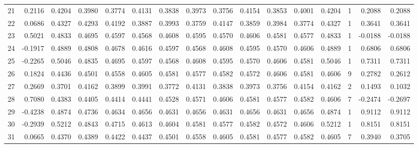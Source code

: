 \begin{tabular}{lrrrrrrrrrrrrrrr}
21  &      0.2116 &  0.4204 &  0.3980 &  0.3774 &  0.4131 &  0.3838 &  0.3973 &  0.3756 &  0.4154 &  0.3853 &   0.4001 &     0.4204 &      1 &                    0.2088 &                     0.2088 \\
22  &      0.0686 &  0.4327 &  0.4293 &  0.4192 &  0.3887 &  0.3993 &  0.3759 &  0.4147 &  0.3859 &  0.3984 &   0.3774 &     0.4327 &      1 &                    0.3641 &                     0.3641 \\
23  &      0.5021 &  0.4833 &  0.4695 &  0.4597 &  0.4568 &  0.4608 &  0.4595 &  0.4570 &  0.4606 &  0.4581 &   0.4577 &     0.4833 &      1 &                   -0.0188 &                    -0.0188 \\
24  &     -0.1917 &  0.4889 &  0.4808 &  0.4678 &  0.4616 &  0.4597 &  0.4568 &  0.4608 &  0.4595 &  0.4570 &   0.4606 &     0.4889 &      1 &                    0.6806 &                     0.6806 \\
25  &     -0.2265 &  0.5046 &  0.4835 &  0.4695 &  0.4597 &  0.4568 &  0.4608 &  0.4595 &  0.4570 &  0.4606 &   0.4581 &     0.5046 &      1 &                    0.7311 &                     0.7311 \\
26  &      0.1824 &  0.4436 &  0.4501 &  0.4558 &  0.4605 &  0.4581 &  0.4577 &  0.4582 &  0.4572 &  0.4606 &   0.4581 &     0.4606 &      9 &                    0.2782 &                     0.2612 \\
27  &      0.2669 &  0.3701 &  0.4162 &  0.3899 &  0.3991 &  0.3772 &  0.4131 &  0.3838 &  0.3973 &  0.3756 &   0.4154 &     0.4162 &      2 &                    0.1493 &                     0.1032 \\
28  &      0.7080 &  0.4383 &  0.4405 &  0.4414 &  0.4441 &  0.4528 &  0.4571 &  0.4606 &  0.4581 &  0.4577 &   0.4582 &     0.4606 &      7 &                   -0.2474 &                    -0.2697 \\
29  &     -0.4238 &  0.4874 &  0.4736 &  0.4634 &  0.4656 &  0.4631 &  0.4656 &  0.4631 &  0.4656 &  0.4631 &   0.4656 &     0.4874 &      1 &                    0.9112 &                     0.9112 \\
30  &     -0.2939 &  0.5212 &  0.4843 &  0.4715 &  0.4613 &  0.4604 &  0.4581 &  0.4577 &  0.4582 &  0.4572 &   0.4606 &     0.5212 &      1 &                    0.8151 &                     0.8151 \\
31  &      0.0665 &  0.4370 &  0.4389 &  0.4422 &  0.4437 &  0.4501 &  0.4558 &  0.4605 &  0.4581 &  0.4577 &   0.4582 &     0.4605 &      7 &                    0.3940 &                     0.3705 \\

\end{tabular}
